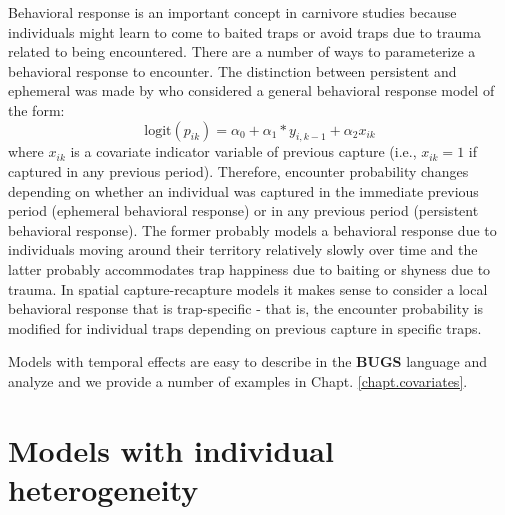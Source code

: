 Behavioral response is an important concept in carnivore studies
because individuals might learn to come to baited traps or avoid traps
due to trauma related to being encountered.  There are a number of
ways to parameterize a behavioral response to encounter. The
distinction between persistent and ephemeral was made by
\citet{yang_chao:2005} who considered a general behavioral response
model of the form:
\[
\mbox{logit}(p_{ik}) = \alpha_{0} + \alpha_{1}*y_{i,k-1} + \alpha_{2} x_{ik}
\]
where $x_{ik}$ is a covariate indicator variable of previous capture
(i.e., $x_{ik} = 1$ if captured in any previous period). Therefore,
encounter probability changes depending on whether an individual was
captured in the immediate previous period (ephemeral behavioral
response) or in any previous period (persistent behavioral
response). The former probably models a behavioral response due to
individuals moving around their territory relatively slowly over time
and the latter probably accommodates trap happiness due to baiting or
shyness due to trauma.  In spatial capture-recapture models it makes
sense to consider a local behavioral response that is trap-specific
\citep{royle_etal:2011jwm} - that is, the encounter probability is
modified for individual traps depending on previous capture in
specific traps.

Models with temporal effects are easy to describe in the {\bf BUGS} language
and analyze and we provide a number of examples in Chapt. \ref{chapt.covariates}. 


\section{ Models with individual heterogeneity}
\label{closed.sec.modelmh}

